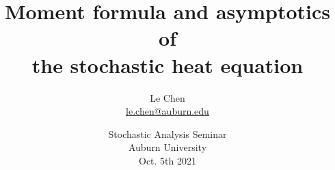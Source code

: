 \title %
{
  Moment formula and asymptotics of \\
  the stochastic heat equation
}

\author{
  Le Chen\\
{\small\url{le.chen@auburn.edu}}
}

\date[Auburn]{Stochastic Analysis Seminar\\ Auburn University\\
\bigskip
Oct. 5th 2021
}
